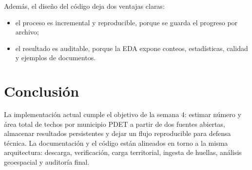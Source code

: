 \documentclass[12pt,a4paper]{article}
\begin{document}
Adem\'as, el dise\~no del c\'odigo deja dos ventajas claras:

\begin{itemize}
  \item el proceso es incremental y reproducible, porque se guarda el progreso por archivo;
  \item el resultado es auditable, porque la EDA expone conteos, estad\'isticas, calidad y ejemplos de documentos.
\end{itemize}

\section{Conclusi\'on}

La implementaci\'on actual cumple el objetivo de la semana 4: estimar n\'umero y \'area total de techos por municipio PDET a partir de dos fuentes abiertas, almacenar resultados persistentes y dejar un flujo reproducible para defensa t\'ecnica. La documentaci\'on y el c\'odigo est\'an alineados en torno a la misma arquitectura: descarga, verificaci\'on, carga territorial, ingesta de huellas, an\'alisis geoespacial y auditor\'ia final.
\end{document}
